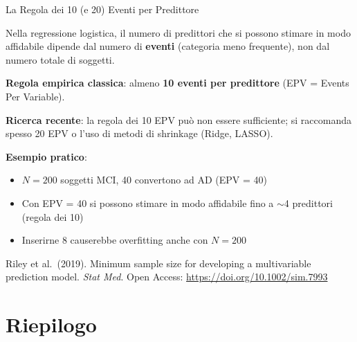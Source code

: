 \documentclass[
  ignorenonframetext,
]{beamer}
\begin{document}
\begin{frame}{La Regola dei 10 (e 20) Eventi per Predittore}
\label{la-regola-dei-10-e-20-eventi-per-predittore}
\small

Nella regressione logistica, il numero di predittori che si possono
stimare in modo affidabile dipende dal numero di \textbf{eventi}
(categoria meno frequente), non dal numero totale di soggetti.

\vspace{0.3em}

\textbf{Regola empirica classica}: almeno \textbf{10 eventi per
predittore} (EPV = Events Per Variable).

\vspace{0.3em}

\textbf{Ricerca recente}: la regola dei 10 EPV può non essere
sufficiente; si raccomanda spesso 20 EPV o l'uso di metodi di shrinkage
(Ridge, LASSO).

\vspace{0.4em}

\textbf{Esempio pratico}:

\begin{itemize}\footnotesize
\item $N = 200$ soggetti MCI, 40 convertono ad AD (EPV = 40)
\item Con EPV = 40 si possono stimare in modo affidabile fino a $\sim$4 predittori (regola dei 10)
\item Inserirne 8 causerebbe overfitting anche con $N = 200$
\end{itemize}

\vspace{0.2em}

\tiny Riley et al.~(2019). Minimum sample size for developing a
multivariable prediction model. \emph{Stat Med}. Open Access:
\url{https://doi.org/10.1002/sim.7993}
\end{frame}

\begin{frame}
\end{frame}

\section{Riepilogo}\label{riepilogo}
\end{document}
